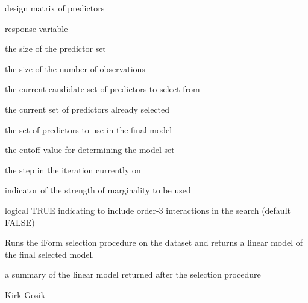 \documentclass[a4paper]{book}
\begin{document}
\begin{Arguments}
\begin{ldescription}
\item[\code{x}] design matrix of predictors

\item[\code{y}] response variable

\item[\code{p}] the size of the predictor set

\item[\code{n}] the size of the number of observations

\item[\code{candidate}] the current candidate set of predictors to select from

\item[\code{solution}] the current set of predictors already selected

\item[\code{model}] the set of predictors to use in the final model

\item[\code{bic}] the cutoff value for determining the model set

\item[\code{step}] the step in the iteration currently on

\item[\code{strong}] indicator of the strength of marginality to be used

\item[\code{higher\_order}] logical TRUE indicating to include order-3 interactions in the search (default FALSE)
\end{ldescription}
\end{Arguments}
%
\begin{Details}\relax
Runs the iForm selection procedure on the dataset and returns a linear model
of the final selected model.
\end{Details}
%
\begin{Value}
a summary of the linear model returned after the selection procedure
\end{Value}
%
\begin{Author}\relax
Kirk Gosik
\end{Author}
\printindex{}
\end{document}

